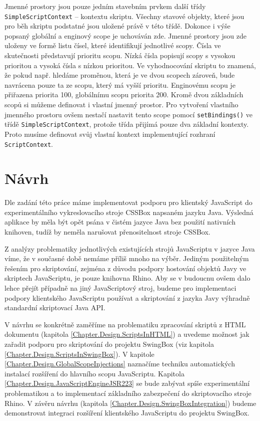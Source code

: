 Jmenné prostory jsou pouze jedním stavebním prvkem další třídy \texttt{SimpleScriptContext} -- kontextu skriptu. Všechny stavové objekty, které jsou pro běh skriptu podstatné jsou uložené právě v této třídě. Dokonce i výše popsaný globální a enginový scope je uchováván zde. Jmenné prostory jsou zde uloženy ve formě listu čísel, které identifikují jednotlivé scopy. Čísla ve skutečnosti představují prioritu scopu. Nízká čísla popisují scopy s vysokou prioritou a vysoká čísla s nízkou prioritou. Ve vyhodnocování skriptu to znamená, že pokud např. hledáme proměnou, která je ve dvou scopech zároveň, bude navrácena pouze ta ze scopu, který má vyšší prioritu. Enginovému scopu je přiřazena priorita 100, globálnímu scopu priorita 200. Kromě dvou základních scopů si můžeme definovat i vlastní jmenný prostor. Pro vytvoření vlastního jmenného prostoru ovšem nestačí nastavit tento scope pomocí \texttt{setBindings()} ve třídě \texttt{SimpleScriptContext}, protože třída přijímá pouze dva základní kontexty. Proto musíme definovat svůj vlastní kontext implementující rozhraní \texttt{ScriptContext}.

\chapter{Návrh}
\label{Chapter.Design}

Dle zadání této práce máme implementovat podporu pro klientský JavaScript do experimentálního vykreslovacího stroje CSSBox napsaném jazyku Java. Výsledná aplikace by měla být opět psána v čistém jazyce Java bez použití nativních knihoven, tudíž by neměla narušovat přenositelnost stroje CSSBox.

Z  analýzy problematiky jednotlivých existujících strojů JavaScriptu v jazyce Java víme, že v současné době nemáme příliš mnoho na výběr. Jediným použitelným řešením pro skriptování, zejména z důvodu podpory hostování objektů Javy ve skriptech JavaScriptu, je pouze knihovna Rhino. Aby se v budoucnu ovšem dalo lehce přejít případně na jiný JavaScriptový stroj, budeme pro implementaci podpory klientského JavaScriptu používat a skriptování z jazyka Javy výhradně standardní skriptovací Java API.

V návrhu se konkrétně zaměříme na problematiku zpracování skriptů z HTML dokumentu (kapitola \ref{Chapter.Design.ScriptsInHTML}) a uvedeme možnost jak zařadit podporu pro skriptování do projektu SwingBox (viz kapitola \ref{Chapter.Design.ScriptsInSwingBox}). V kapitole \ref{Chapter.Design.GlobalScopeInjections} naznačíme techniku automatických instalací rozšíření do hlavního scopu JavaScriptu. Kapitola \ref{Chapter.Design.JavaScriptEngineJSR223} se bude zabývat spíše experimentální problematikou a to implementací základního zabezpečení do skriptovacího stroje Rhino. V závěru návrhu (kapitola \ref{Chapter.Design.SwingBoxIntegration}) budeme demonstrovat integraci rozšíření klientského JavaScriptu do projektu SwingBox.


